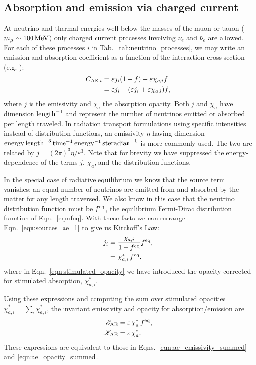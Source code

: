 \documentclass[aps,floatfix,prd,superscriptaddress,twocolumn]{revtex4-1}
\begin{document}
\subsection{Absorption and emission via charged current}
\label{ssec:sources_ae}
At neutrino and thermal energies well below the masses of the muon or tauon
($m_{\mu}\sim100\,{\rm MeV}$)
only charged current processes involving $\nu_e$ and $\bar{\nu}_e$ are allowed.
For each of these processes $i$ in Tab.~\ref{tab:neutrino_processes},
we may write an emission and absorption
coefficient as a function of the interaction cross-section
(e.g. \cite[Eqn.~A5]{brue1985-core_collapse}):
\begin{align}
  \label{eqn:sources_ae_1}
  C_{{\rm AE},i}
  &= \varepsilon j_i (1-f) - \varepsilon \chi_{a,i} f \\
  \label{eqn:sources_ae_2}
  &= \varepsilon j_i - (\varepsilon j_i+\varepsilon \chi_{a,i}) f,
\end{align}
where $j$ is the emissivity and $\chi_a$ the absorption opacity.
Both $j$ and $\chi_a$ have dimension ${\rm length}^{-1}$ and represent the
number of neutrinos emitted or absorbed per length traveled.
In radiation transport formulations using specific intensities instead of
distribution functions, an emissivity $\eta$ having dimension
${\rm energy}\,{\rm length}^{-3}\,{\rm time}^{-1}\,{\rm energy}^{-1}\,{\rm steradian}^{-1}$
is more commonly used.
The two are related by $j=(2\pi)^3\eta/\varepsilon^3$.
Note that for brevity we have suppressed the energy-dependence of
the terms $j$, $\chi_a$, and the distribution functions.

In the special case of radiative equilibrium we know that the source
term vanishes: an equal number of neutrinos are emitted from
and absorbed by the matter for any length traversed.
We also know in this case that the neutrino distribution function must be
$f^{\rm eq}$, the equilibrium Fermi-Dirac distribution function of
Eqn.~\ref{eqn:feq}.
With these facts we can rerrange Eqn.~\ref{eqn:sources_ae_1} to give us
Kirchoff's Law:
\begin{align}
  \label{eqn:kirchoffs_law}
  j_i &= \frac{\chi_{a,i}}{1-f^{\rm eq}}f^{\rm eq}, \\
  \label{eqn:stimulated_opacity}
  &= \chi^*_{a,i}\,f^{\rm eq},
\end{align}
where in Eqn.~\ref{eqn:stimulated_opacity} we have introduced the opacity
corrected for stimulated absorption, $\chi^*_{a,i}$.

Using these expressions and computing the sum over stimulated opacities
$\chi^*_{a,i}=\sum_i \chi^*_{a,i}$,
the invariant emissivity and opacity for absorption/emission are
\begin{align}
  \label{eqn:ae_emissivity_summed_2}
  \mathscr{E}_{{\rm AE}} &= \varepsilon \, \chi^*_a \, f^{\rm eq}, \\
  \label{eqn:ae_opacity_summed_2}
  \mathscr{K}_{{\rm AE}} &= \varepsilon \, \chi^*_a.
\end{align}
These expressions are equivalent to those in
Eqns.~\ref{eqn:ae_emissivity_summed} and \ref{eqn:ae_opacity_summed}.
\end{document}
